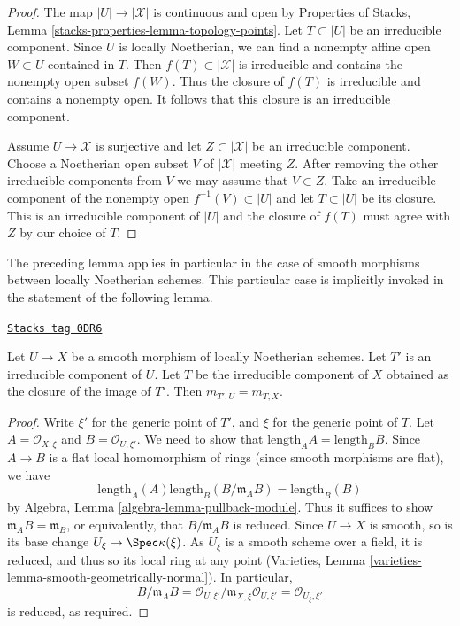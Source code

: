 \begin{proof}
The map $|U| \to |\mathcal{X}|$ is continuous and open by
Properties of Stacks, Lemma \ref{stacks-properties-lemma-topology-points}.
Let $T \subset |U|$ be an irreducible component. Since $U$ is locally
Noetherian, we can find a nonempty affine open $W \subset U$ contained in $T$.
Then $f(T) \subset |\mathcal{X}|$ is irreducible and contains the
nonempty open subset $f(W)$. Thus the closure of $f(T)$ is irreducible and
contains a nonempty open. It follows that this closure is an irreducible
component.

\medskip\noindent
Assume $U \to \mathcal{X}$ is surjective and let $Z \subset |\mathcal{X}|$
be an irreducible component. Choose a Noetherian open subset $V$
of $|\mathcal{X}|$ meeting $Z$. After removing the other irreducible
components from $V$ we may assume that $V \subset Z$.
Take an irreducible component of the nonempty
open $f^{-1}(V) \subset |U|$ and let $T \subset |U|$ be its closure.
This is an irreducible component of $|U|$ and the closure of $f(T)$
must agree with $Z$ by our choice of $T$.
\end{proof}

The preceding lemma applies in particular in the case of smooth morphisms
between locally Noetherian schemes. This particular case is
implicitly invoked in the statement of the following lemma.

\begin{lemma}[Multiplicities]
\label{stacks-geometry-lemma-multiplicities}
\href{https://stacks.math.columbia.edu/tag/0DR6}{\texttt{Stacks tag 0DR6}}

Let $U \to X$ be a smooth morphism of locally Noetherian schemes.
Let $T'$ is an irreducible component of $U$. Let $T$ be the
irreducible component of $X$ obtained as the closure of the
image of $T'$. Then $m_{T', U} = m_{T, X}$.
\end{lemma}

\begin{proof}
Write $\xi'$ for the generic point of $T'$, and $\xi$ for the
generic point of $T$. Let $A = \mathcal{O}_{X, \xi}$ and
$B = \mathcal{O}_{U, \xi'}$. We need to show that
$\text{length}_A A = \text{length}_B B$. Since
$A \to B$ is a flat local homomorphism of rings
(since smooth morphisms are flat), we have
$$
\text{length}_A(A) \text{length}_B(B/\mathfrak m_A B) =
\text{length}_B(B)
$$
by Algebra, Lemma \ref{algebra-lemma-pullback-module}. Thus it suffices
to show $\mathfrak m_A B = \mathfrak m_B$, or equivalently, that
$B/\mathfrak m_A B$ is reduced. Since $U \to X$ is smooth,
so is its base change $U_{\xi} \to \Spec \kappa(\xi)$. As $U_{\xi}$ is a
smooth scheme over a field, it is reduced, and thus so its local ring
at any point
(Varieties, Lemma \ref{varieties-lemma-smooth-geometrically-normal}).
In particular,
$$
B/\mathfrak m_A B =
\mathcal{O}_{U, \xi'}/\mathfrak m_{X, \xi}\mathcal{O}_{U, \xi'} =
\mathcal{O}_{U_\xi, \xi'}
$$
is reduced, as required.
\end{proof}

